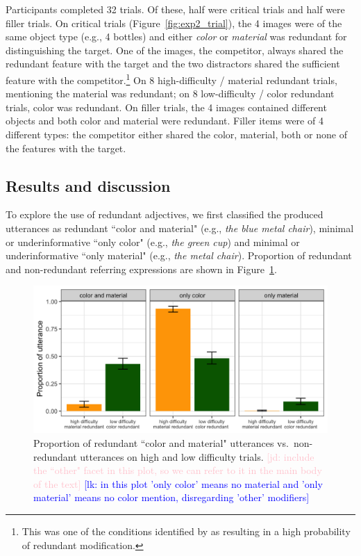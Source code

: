 \documentclass[12pt,letterpaper]{article}
\newcommand{\jd}[1]{\textcolor{Pink}{[jd: #1]}}
\newcommand{\lk}[1]{\textcolor{Blue}{[lk: #1]}}
\begin{document}
Participants completed 32 trials. Of these, half were critical trials and half were filler trials. On critical trials (Figure~\ref{fig:exp2_trial}), the 4 images were of the same object type (e.g., 4 bottles) and either \textit{color} or \textit{material} was redundant for distinguishing the target. One of the images, the competitor, always shared the redundant feature with the target and the two distractors shared the sufficient feature with the competitor.\footnote{This was one of the conditions identified by \citet{DegenEtAl2020} as resulting in a high probability of redundant modification.} On 8 high-difficulty / material redundant trials, mentioning the material was redundant; on 8 low-difficulty / color redundant trials, color was redundant. On filler trials, the 4 images contained different objects and both color and material were redundant. Filler items were of 4 different types: the competitor either shared the color, material, both or none of the features with the target. 

\subsection{Results and discussion}

To explore the use of redundant adjectives, we first classified the produced utterances as redundant ``color and material"  (e.g., \textit{the blue metal chair}), minimal or underinformative ``only color" (e.g., \textit{the green cup}) and minimal or underinformative ``only material" (e.g., \textit{the metal chair}). Proportion of redundant  and non-redundant referring expressions are shown in Figure~\ref{fig:exp2_proportion}. 

\begin{figure}[ht]
\centering
\includegraphics[width=.8\textwidth]{plots/exp2_proportion.png}
\caption{Proportion of redundant ``color and material" utterances vs.~non-redundant utterances on high and low difficulty trials. \jd{include the ``other" facet in this plot, so we can refer to it in the main body of the text} \lk{in this plot 'only color' means no material and 'only material' means no color mention, disregarding 'other' modifiers}}
\label{fig:exp2_proportion}
\end{figure}
\end{document}
